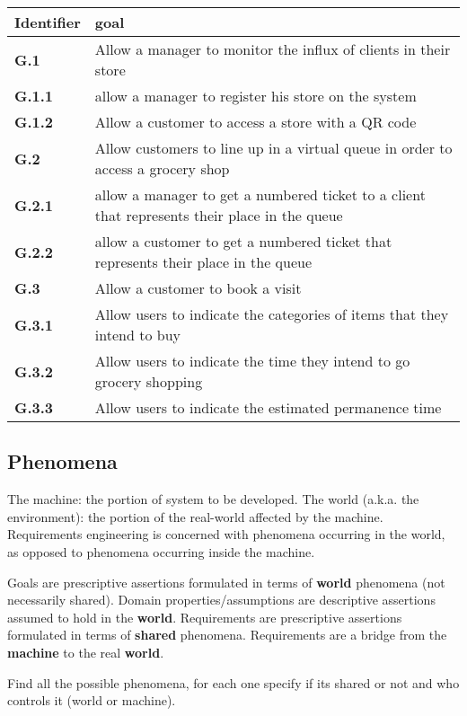 \begin{tabular}{|l|l|}
    \hline
    \textbf{Identifier} & \textbf{goal}\\
    \hline
    \textbf{G.1} & Allow a manager to monitor the influx of clients in their store\\
    \textbf{G.1.1} & allow a manager to register his store on the system\\
    \textbf{G.1.2} & Allow a customer to access a store with a QR code\\
    \hline
    \textbf{G.2} & Allow customers to line up in a virtual queue in order to access a grocery shop\\
    \textbf{G.2.1} & allow a manager to get a numbered ticket to a client that represents their place in the queue\\
    \textbf{G.2.2} & allow a customer to get a numbered ticket that represents their place in the queue\\
    \hline
    \textbf{G.3} & Allow a customer to book a visit\\
    \textbf{G.3.1} & Allow users to indicate the categories of items that they intend to buy\\
    \textbf{G.3.2} & Allow users to indicate the time they intend to go grocery shopping\\
    \textbf{G.3.3} & Allow users to indicate the estimated permanence time \\
    \hline
\end{tabular}

\subsection{Phenomena}
\label{subsect:phenomena}

The machine: the portion of system to be developed.
The world (a.k.a. the environment): the portion of the real-world affected by the machine.
Requirements engineering is concerned with phenomena occurring in the world, as opposed to phenomena occurring inside the machine.

Goals are prescriptive assertions formulated in terms of \textbf{world} phenomena (not necessarily shared).
Domain properties/assumptions are descriptive assertions assumed to hold in the \textbf{world}.
Requirements are prescriptive assertions formulated in terms of \textbf{shared} phenomena.
Requirements are a bridge from the \textbf{machine} to the real \textbf{world}.

Find all the possible phenomena, for each one specify if its shared or not and who controls it (world or machine). 

